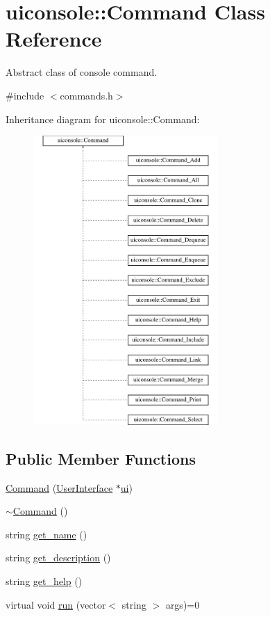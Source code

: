 \hypertarget{classuiconsole_1_1Command}{
\section{uiconsole::Command Class Reference}
\label{dc/df0/classuiconsole_1_1Command}
}


Abstract class of console command.  




{\ttfamily \#include $<$commands.h$>$}

Inheritance diagram for uiconsole::Command:\begin{figure}[H]
\begin{center}
\leavevmode
\includegraphics[height=11.000000cm]{dc/df0/classuiconsole_1_1Command}
\end{center}
\end{figure}
\subsection*{Public Member Functions}
\begin{DoxyCompactItemize}
\item 
\hyperlink{classuiconsole_1_1Command_a4f28955b8a36ef1d3b4402b081346060}{Command} (\hyperlink{classUserInterface}{UserInterface} $\ast$\hyperlink{classuiconsole_1_1Command_ab43ed5152860c099f858d62f9f556699}{ui})
\item 
\hyperlink{classuiconsole_1_1Command_a11421d325715cfc8f1e779ef823b3445}{$\sim$Command} ()
\item 
string \hyperlink{classuiconsole_1_1Command_a64d37b0931d5ba0a35d535a6f5a443f3}{get\_\-name} ()
\item 
string \hyperlink{classuiconsole_1_1Command_abcc8cf2d95618e990449e41b510c3fdc}{get\_\-description} ()
\item 
string \hyperlink{classuiconsole_1_1Command_a79b882f32e4ed531f950b0030e2d4998}{get\_\-help} ()
\item 
virtual void \hyperlink{classuiconsole_1_1Command_a5c4d205b1de13a6b3d0db73ddc7ebefa}{run} (vector$<$ string $>$ args)=0
\end{DoxyCompactItemize}
